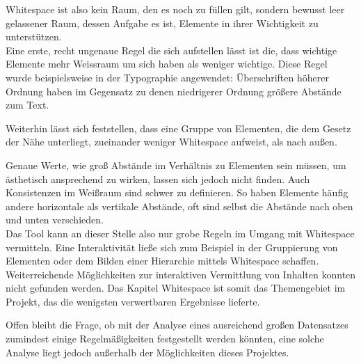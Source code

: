 Whitespace ist also kein Raum, den es noch zu füllen gilt, sondern bewusst leer gelassener Raum, dessen Aufgabe es ist, Elemente in ihrer Wichtigkeit zu unterstützen. \\
Eine erste, recht ungenaue Regel die sich aufstellen lässt ist die, dass wichtige Elemente mehr Weissraum um sich haben als weniger wichtige. Diese Regel wurde beispielsweise in der Typographie angewendet: Überschriften höherer Ordnung haben im Gegensatz zu denen niedrigerer Ordnung größere Abstände zum Text.

Weiterhin lässt sich feststellen, dass eine Gruppe von Elementen, die dem Gesetz der Nähe \cite{mayer2005einfuhrung} unterliegt, zueinander weniger Whitespace aufweist, als nach außen.

Genaue Werte, wie groß Abstände im Verhältnis zu Elementen sein müssen, um ästhetisch ansprechend zu wirken, lassen sich jedoch nicht finden. Auch Konsistenzen im Weißraum sind schwer zu definieren. So haben Elemente häufig andere horizontale als vertikale Abstände, oft sind selbst die Abstände nach oben und unten verschieden. \\
Das Tool kann an dieser Stelle also nur grobe Regeln im Umgang mit Whitespace vermitteln. Eine Interaktivität ließe sich zum Beispiel in der Gruppierung von Elementen oder dem Bilden einer Hierarchie mittels Whitespace schaffen. Weiterreichende Möglichkeiten zur interaktiven Vermittlung von Inhalten konnten nicht gefunden werden. Das Kapitel Whitespace ist somit das Themengebiet im Projekt, das die wenigsten verwertbaren Ergebnisse lieferte.

Offen bleibt die Frage, ob mit der Analyse eines ausreichend großen Datensatzes zumindest einige Regelmäßigkeiten festgestellt werden könnten, eine solche Analyse liegt jedoch außerhalb der Möglichkeiten dieses Projektes.

\clearpage
